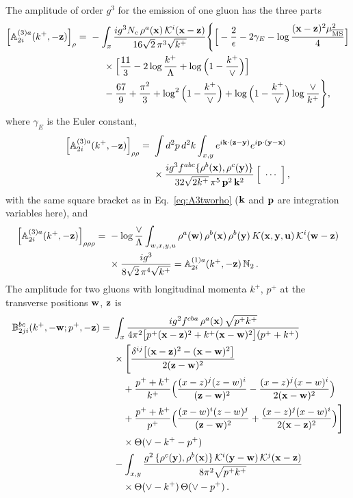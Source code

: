 The amplitude of order $g^3$ for the emission of one gluon has the three parts
\begin{align}\label{eq:A3onerhoX}
\Big[\mf A^{(3)a}_{2i}(k^+,-\v z)\Big]_{\rho}=\ &-\int_x\frac{ig^3N_c\,\rho^a(\v x)\,\Kv^i(\v x-\v z)}{16\sqrt2\,\pi^3\sqrt{k^+}}\Bigg\{\Big[-\frac2\epsilon-2\gamma_E-\log\frac{(\v x-\v z)^2\mu^2_{\MS}}{4}\Big]
\notag\\&\hspace{0.5cm}\times\Big[\frac{11}{3}-2\log\frac{k^+}{\Lambda}+\log\Big(1-\frac{k^+}{\vee}\Big)\Big]
\notag\\&\hspace{0.5cm}
-\frac{67}{9}+\frac{\pi^2}{3}+\log^2\Big(1-\frac{k^+}{\vee}\Big)+\log\Big(1-\frac{k^+}{\vee}\Big)\log\frac{\vee}{k^+}\Bigg\},
\end{align}
where $\gamma_E$ is the Euler constant,
\begin{align}\label{eq:A3tworhoX}
\Big[\mathbb{A}^{(3)a}_{2i}(k^+,-\mathbf{z})\Big]_{\rho\rho}=\ &\int d^2p\,d^2k\int_{x,y}e^{i\mathbf{k}\cdot(\mathbf{z}-\mathbf{y})}e^{i\mathbf{p}\cdot(\mathbf{y}-\mathbf{x})}\,\notag\\&\times\frac{ig^3f^{abc}\{\rho^b(\mathbf{x}),\rho^c(\mathbf{y})\}}{32\sqrt{2k^+}\,\pi^5\,\mathbf{p}^2\,\mathbf{k}^2}\,\Big[\ \cdots\ \Big]\,,
\end{align}
with the same square bracket as in Eq.~\eqref{eq:A3tworho} ($\mathbf{k}$ and $\mathbf{p}$ are integration variables here), and
\begin{align}\label{eq:A3threerhoX}
\Big[\mf A^{(3)a}_{2i}(k^+,-\v z)\Big]_{\rho\rho\rho}=\ &-\log\frac{\vee}{\Lambda}\int_{w,x,y,u}\rho^a(\v w)\,\rho^b(\v x)\,\rho^b(\v y)\,K(\v x,\v y,\v u)\,\Kv^i(\v w-\v z)\notag\\&\times\frac{ig^3}{8\sqrt2\,\pi^4\sqrt{k^+}}=\mf A^{(1)a}_{2i}(k^+,-\v z)\,\mf N_2\,.
\end{align}
The amplitude for two gluons with longitudinal momenta $k^+$, $p^+$ at the transverse positions $\mathbf{w}$, $\mathbf{z}$ is
\begin{align}\label{eq:B2X}
\mf B^{bc}_{2ji}(k^+,-\v w;p^+,-\v z)=\ &\int_x\frac{ig^2f^{cba}\,\rho^a(\v x)\,\sqrt{p^+k^+}}{4\pi^2\big[p^+(\v x-\v z)^2+k^+(\v x-\v w)^2\big](p^++k^+)}
\notag\\&\times\Bigg[\frac{\delta^{ij}\big[(\v x-\v z)^2-(\v x-\v w)^2\big]}{2(\v z-\v w)^2}
\notag\\&\quad
+\frac{p^++k^+}{k^+}\Big(\frac{(x-z)^j(z-w)^i}{(\v z-\v w)^2}-\frac{(x-z)^j(x-w)^i}{2(\v x-\v w)^2}\Big)
\notag\\&\quad
+\frac{p^++k^+}{p^+}\Big(\frac{(x-w)^i(z-w)^j}{(\v z-\v w)^2}+\frac{(x-z)^j(x-w)^i}{2(\v x-\v z)^2}\Big)\Bigg]
\notag\\&\quad\times\Theta(\vee-k^+-p^+)
\notag\\&
-\int_{x,y}\frac{g^2\,\{\rho^c(\v y),\rho^b(\v x)\}\,\Kv^i(\v y-\v w)\,\Kv^j(\v x-\v z)}{8\pi^2\sqrt{p^+k^+}}
\notag\\&\quad\times\Theta(\vee-k^+)\,\Theta(\vee-p^+)\,.
\end{align}
